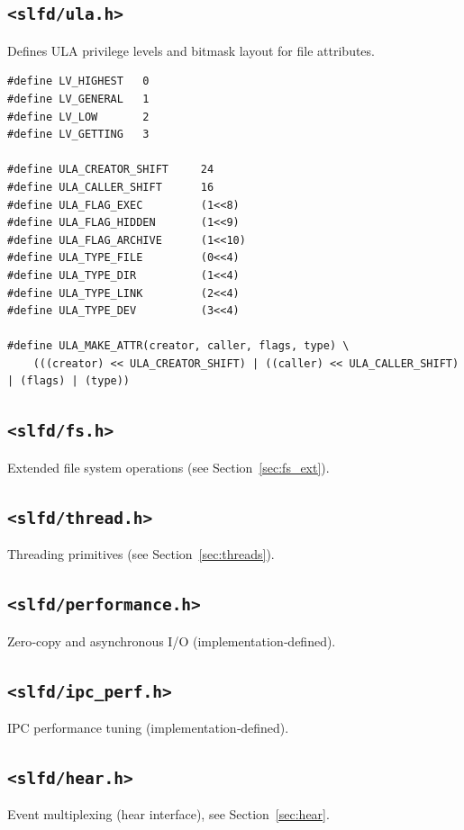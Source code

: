 \documentclass[12pt,a4paper]{article}
\begin{document}
\subsection[<slfd/ula.h>]{\texorpdfstring{\texttt{<slfd/ula.h>}}{<slfd/ula.h>}}
Defines ULA privilege levels and bitmask layout for file attributes.
\begin{lstlisting}
#define LV_HIGHEST   0
#define LV_GENERAL   1
#define LV_LOW       2
#define LV_GETTING   3

#define ULA_CREATOR_SHIFT     24
#define ULA_CALLER_SHIFT      16
#define ULA_FLAG_EXEC         (1<<8)
#define ULA_FLAG_HIDDEN       (1<<9)
#define ULA_FLAG_ARCHIVE      (1<<10)
#define ULA_TYPE_FILE         (0<<4)
#define ULA_TYPE_DIR          (1<<4)
#define ULA_TYPE_LINK         (2<<4)
#define ULA_TYPE_DEV          (3<<4)

#define ULA_MAKE_ATTR(creator, caller, flags, type) \
    (((creator) << ULA_CREATOR_SHIFT) | ((caller) << ULA_CALLER_SHIFT) | (flags) | (type))
\end{lstlisting}

\subsection[<slfd/fs.h>]{\texorpdfstring{\texttt{<slfd/fs.h>}}{<slfd/fs.h>}}
Extended file system operations (see Section~\ref{sec:fs_ext}).

\subsection[<slfd/thread.h>]{\texorpdfstring{\texttt{<slfd/thread.h>}}{<slfd/thread.h>}}
Threading primitives (see Section~\ref{sec:threads}).

\subsection[<slfd/performance.h>]{\texorpdfstring{\texttt{<slfd/performance.h>}}{<slfd/performance.h>}}
Zero‑copy and asynchronous I/O (implementation‑defined).

\subsection[<slfd/ipc_perf.h>]{\texorpdfstring{\texttt{<slfd/ipc\_perf.h>}}{<slfd/ipc_perf.h>}}
IPC performance tuning (implementation‑defined).

\subsection[<slfd/hear.h>]{\texorpdfstring{\texttt{<slfd/hear.h>}}{<slfd/hear.h>}}
Event multiplexing (hear interface), see Section~\ref{sec:hear}.
\end{document}
